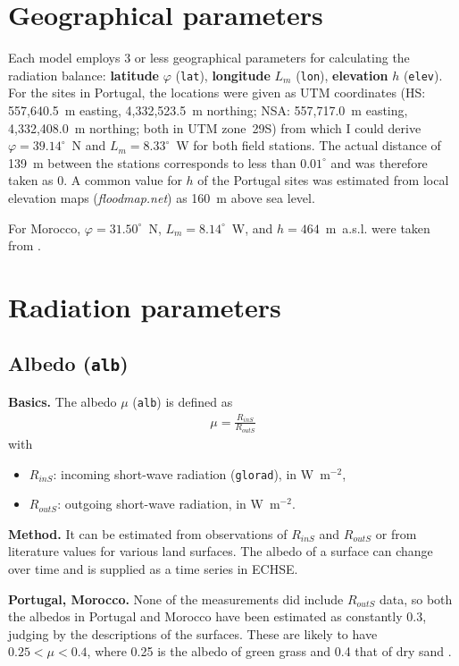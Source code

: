 \documentclass{scrreprt}
\newenvironment{denseitem}{
  \begin{itemize}
    \setlength{\itemsep}{0pt}
    \setlength{\parskip}{0pt}
    \setlength{\parsep}{0pt}
}{
  \end{itemize}
}
\begin{document}
\section{Geographical parameters} \label{sec:parest_geo}

Each model employs 3 or less geographical parameters for calculating the radiation balance: \textbf{latitude} $\varphi$ (\verb!lat!), \textbf{longitude} $L_m$ (\verb!lon!), \textbf{elevation} $h$ (\verb!elev!).
For the sites in Portugal, the locations were given as UTM coordinates (HS: 557,640.5~m easting, 4,332,523.5~m northing; NSA: 557,717.0~m easting, 4,332,408.0~m northing; both in UTM zone~29S) from which I could derive $\varphi = 39.14^\circ$~N and $L_m= 8.33^\circ$~W for both field stations.
The actual distance of 139~m between the stations corresponds to less than $0.01^\circ$ and was therefore taken as 0.
A common value for $h$ of the Portugal sites was estimated from local elevation maps (\emph{floodmap.net}) as 160~m above sea level.

For Morocco, $\varphi = 31.50^\circ$~N, $L_m = 8.14^\circ$~W, and $h = 464$~m~a.s.l. were taken from \citet{mroos14}.

\section{Radiation parameters} \label{sec:parest_rad}

\subsection{Albedo (\texttt{alb})} \label{ssec:parest_rad_alb}

\textbf{Basics.}
The albedo $\mu$ (\verb!alb!) is defined as
\begin{align*}
  \mu = \frac{R_{inS}}{R_{outS}}
\end{align*}
%
with
\begin{denseitem}
  \item[] $R_{inS}$: incoming short-wave radiation (\verb!glorad!), in W~m$^{-2}$,
  \item[] $R_{outS}$: outgoing short-wave radiation, in W~m$^{-2}$.
\end{denseitem}

\textbf{Method.}
It can be estimated from observations of $R_{inS}$ and $R_{outS}$ or from literature values for various land surfaces.
The albedo of a surface can change over time and is supplied as a time series in ECHSE.

\textbf{Portugal, Morocco.} None of the measurements did include $R_{outS}$ data, so both the albedos in Portugal and Morocco have been estimated as constantly 0.3, judging by the descriptions of the surfaces.
These are likely to have $0.25 < \mu < 0.4$, where 0.25 is the albedo of green grass \citep{markvart03} and 0.4 that of dry sand \citep{tetzlaff83}.
\end{document}
